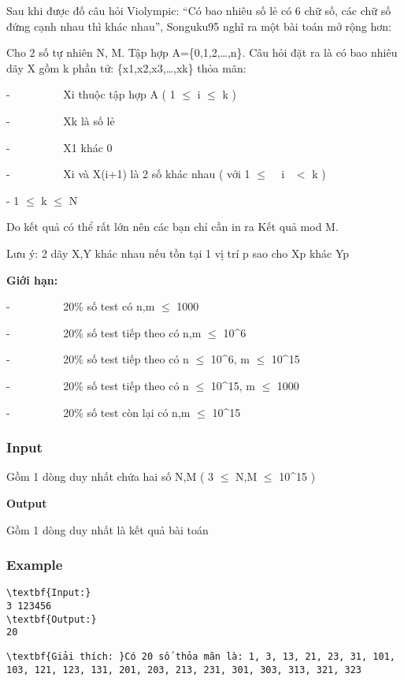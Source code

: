 



   Sau khi được đố câu hỏi Violympic: “Có bao nhiêu số lẻ có 6 chữ số, các chữ số đứng cạnh nhau thì khác nhau”, Songuku95 nghĩ ra một bài toán mở rộng hơn:   


   Cho 2 số tự nhiên N, M. Tập hợp A=\{0,1,2,…,n\}. Câu hỏi đặt ra là có bao nhiêu dãy X gồm k phần tử: \{x1,x2,x3,…,xk\} thỏa mãn:  

   -          Xi thuộc tập hợp A ( 1  $\le$  i  $\le$  k )  

   -          Xk là số lẻ  

   -          X1 khác 0  

   -          Xi và X(i+1) là 2 số khác nhau ( với 1  $\le$   i  $<$ k )   

    -      1  $\le$  k  $\le$  N  

   Do kết quả có thể rất lớn nên các bạn chỉ cần in ra Kết quả mod M.  

   Lưu ý: 2 dãy X,Y khác nhau nếu tồn tại 1 vị trí p sao cho Xp khác Yp  

\textbf{    Giới hạn:   }

   -          20\% số test có n,m  $\le$  1000  

   -          20\% số test tiếp theo có n,m  $\le$  10^6  

   -          20\% số test tiếp theo có n  $\le$  10^6, m  $\le$  10^15  

   -          20\% số test tiếp theo có n  $\le$  10^15, m  $\le$  1000  

   -          20\% số test còn lại có n,m  $\le$  10^15  

\subsubsection{   Input  }

   Gồm 1 dòng duy nhất chứa hai số N,M ( 3  $\le$  N,M  $\le$  10^15 )  

\textbf{     Output    }

   Gồm 1 dòng duy nhất là kết quả bài toán  



\subsubsection{   Example  }
\begin{verbatim}
\textbf{Input:}
3 123456
\textbf{Output:}
20\end{verbatim}
\begin{verbatim}
\textbf{Giải thích: }Có 20 số thỏa mãn là: 1, 3, 13, 21, 23, 31, 101, 103, 121, 123, 131, 201, 203, 213, 231, 301, 303, 313, 321, 323\end{verbatim}
